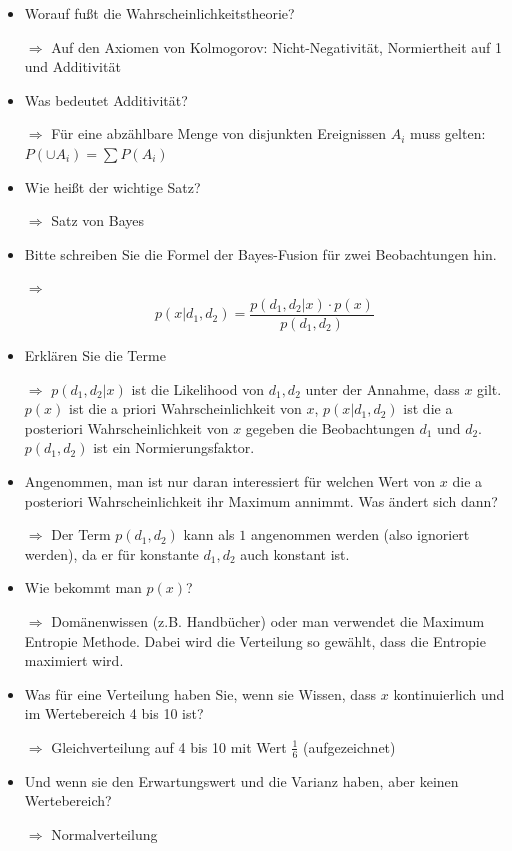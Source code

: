 \documentclass[a4paper]{article}
\begin{document}
    \begin{itemize}
        \item Worauf fußt die Wahrscheinlichkeitstheorie?
        \item[$\Rightarrow$] Auf den Axiomen von Kolmogorov: Nicht-Negativität, Normiertheit auf 1 und Additivität
        \item Was bedeutet Additivität?
        \item[$\Rightarrow$] Für eine abzählbare Menge von disjunkten Ereignissen $A_i$ muss gelten: $P(\cup A_i) = \sum P(A_i)$
        \item Wie heißt der wichtige Satz?
        \item[$\Rightarrow$] Satz von Bayes
        \item Bitte schreiben Sie die Formel der Bayes-Fusion für zwei Beobachtungen hin.
        \item[$\Rightarrow$] $$p(x | d_1, d_2) = \frac{p(d_1, d_2 | x) \cdot p(x)}{p(d_1, d_2)}$$
        \item Erklären Sie die Terme
        \item[$\Rightarrow$] $p(d_1, d_2 | x)$ ist die Likelihood von $d_1, d_2$ unter der Annahme, dass $x$ gilt. $p(x)$ ist die a priori Wahrscheinlichkeit von $x$, $p(x | d_1, d_2)$ ist die a posteriori Wahrscheinlichkeit von $x$ gegeben die Beobachtungen $d_1$ und $d_2$. $p(d_1, d_2)$ ist ein Normierungsfaktor.
        \item Angenommen, man ist nur daran interessiert für welchen Wert von $x$ die a posteriori Wahrscheinlichkeit ihr Maximum annimmt. Was ändert sich dann?
        \item[$\Rightarrow$] Der Term $p(d_1, d_2)$ kann als $1$ angenommen werden (also ignoriert werden), da er für konstante $d_1, d_2$ auch konstant ist.
        \item Wie bekommt man $p(x)$?
        \item[$\Rightarrow$] Domänenwissen (z.B. Handbücher) oder man verwendet die Maximum Entropie Methode. Dabei wird die Verteilung so gewählt, dass die Entropie maximiert wird.
        \item Was für eine Verteilung haben Sie, wenn sie Wissen, dass $x$ kontinuierlich und im Wertebereich 4 bis 10 ist?
        \item[$\Rightarrow$] Gleichverteilung auf 4 bis 10 mit Wert $\frac{1}{6}$ (aufgezeichnet)
        \item Und wenn sie den Erwartungswert und die Varianz haben, aber keinen Wertebereich?
        \item[$\Rightarrow$] Normalverteilung

\end{itemize}
\end{document}
